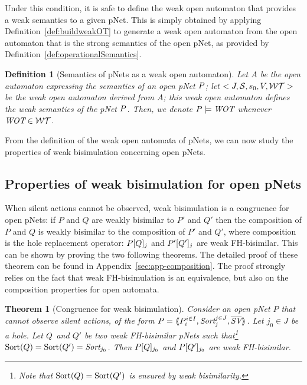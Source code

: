 \documentclass{lmcs}
\newcommand{\TODO}[1]{\textcolor{red}{\textbf{[TODO:#1]}}}
\newtheorem{theorem}{Theorem}
\newtheorem{definition}{Definition}
\begin{document}

Under this condition, it is safe to define the weak open automaton that provides a weak semantics to a given pNet. This is simply obtained by applying Definition~\ref{def:buildweakOT} to generate a weak open automaton from the open automaton that is the strong semantics of the open pNet, as provided by Definition~\ref{def:operationalSemantics}.

\begin{definition}[Semantics of pNets as a weak open automaton]
Let $A$ be the open automaton expressing the semantics of an open pNet $P$; let $<J,\mathcal{S},s_0, V, \mathcal{WT}>$ be the weak open automaton derived from $A$; this weak open automaton defines the weak semantics of the pNet $P$. Then, we denote $\pNet \models \WOT$ whenever $\WOT\in\WT$.
\end{definition}

From the definition of the weak open automata of pNets, we can now study the properties of weak bisimulation concerning open pNets.

\subsection{Properties of weak bisimulation for open pNets}

When silent actions cannot be observed, weak bisimulation is a congruence for open pNets: if $P$ and $Q$ are weakly bisimilar to $P'$ and $Q'$ then the composition of $P$ and $Q$ is weakly bisimilar to the composition of $P'$ and $Q'$, where composition is the hole replacement operator: 	$P[Q]_{j}$ and 
	$P'[Q']_{j}$ are weak FH-bisimilar. This can be shown by proving the two following theorems.
The detailed proof of these theorem can be found in Appendix~\ref{sec:app-composition}. The proof strongly relies on the fact that weak FH-bisimulation is an equivalence, but also on the composition properties for open automata.

\begin{theorem}[Congruence for  weak bisimulation]\label{weak-thm-congr-eq}
	Consider an open pNet $P$
 that cannot observe silent actions, of the form 	$\pNet = \mylangle \pNet_i^{i\in I}, \Sort_j^{j\in J}, 
	\set{\symb{SV}}\myrangle$.
	Let $j_0\in J$ be a hole. Let $Q$ and $Q'$ be two weak FH-bisimilar pNets such that\footnote{Note that $\operatorname{Sort}(Q)=\operatorname{Sort}(Q')$ is 
	ensured by 
	weak bisimilarity.} 
	$\Sortop(\pNetQ)=\Sortop(\pNetQ')=\Sort_{j_0}$. Then 
	$P[Q]_{j_0}$ and 
	$P[Q']_{j_0}$ are weak FH-bisimilar.
\end{theorem}
\end{document}
